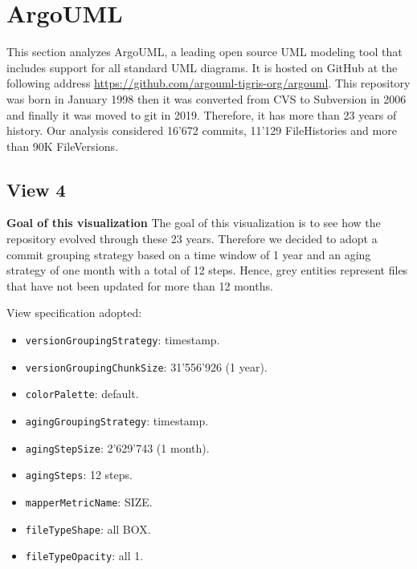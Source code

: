 \section{ArgoUML}
This section analyzes ArgoUML, a leading open source UML modeling tool that includes support for all standard UML diagrams. 
It is hosted on GitHub at the following address \url{https://github.com/argouml-tigris-org/argouml}. 
This repository was born in January 1998 then it was converted from CVS to Subversion in 2006 and finally it was moved to git in 2019.
Therefore, it has more than 23 years of history. 
Our analysis considered 16'672 commits, 11'129 FileHistories and more than 90K FileVersions. 

\subsection{View 4}
\label{subsec:view4}
\textbf{Goal of this visualization}
The goal of this visualization is to see how the repository evolved through these 23 years. Therefore we decided to adopt a commit grouping strategy based on a time window of 1 year and an aging strategy of one month with a total of 12 steps. Hence, grey entities represent files that have not been updated for more than 12 months. 

\bigbreak
View specification adopted: 
\begin{itemize}
    \item \texttt{versionGroupingStrategy}: timestamp.
    \item \texttt{versionGroupingChunkSize}: 31'556'926 (1 year). 
    \item \texttt{colorPalette}: default.
    \item \texttt{agingGroupingStrategy}: timestamp.
    \item \texttt{agingStepSize}: 2'629'743 (1 month).
    \item \texttt{agingSteps}: 12 steps.
    \item \texttt{mapperMetricName}: SIZE. 
    \item \texttt{fileTypeShape}: all BOX. 
    \item \texttt{fileTypeOpacity}: all 1. 
\end{itemize}

